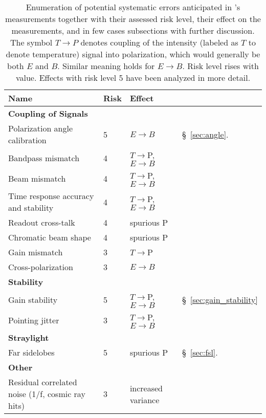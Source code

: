\begin{table}[h!]
\hspace{-0.1in}
\parbox{4.0in}{
\centering
\scriptsize
 \begin{tabular}{p{3.3cm} p{0.5cm} p{1.4cm} p{1.7cm}}
 \hline
\textbf{Name} & \textbf{Risk}&\textbf{Effect} \\
 \hline
\textbf{Coupling of Signals}& &\\
Polarization angle calibration\dotfill&
5&
$E{\to}B$ &
\S~\ref{sec:angle}.
\\
 Bandpass mismatch\dotfill&
 4&
$T{\to}$P, $E{\to}B$
   \\
Beam mismatch\dotfill&
4&
$T{\to}$P, $E{\to}B$
& %
\\
Time response accuracy and stability\dotfill&
4&
$T{\to}$P, $E{\to}B$
\\
Readout cross-talk\dotfill&
4&
spurious P
\\
Chromatic beam shape\dotfill&
4&
spurious P
\\

Gain mismatch\dotfill&
3&
$T{\to}$P
\\


Cross-polarization\dotfill&
3&
$E{\to}B$
\\
\hline
\textbf{Stability} & & \\
Gain stability\dotfill&
5&
$T{\to}$P, $E{\to} B$
&
\S~\ref{sec:gain_stability}
\\
Pointing jitter\dotfill&
3&
$T{\to}$P, $E{\to}B$
\\

\hline
\textbf{Straylight}& & \\
Far sidelobes\dotfill&
5&
spurious P
&
\S~\ref{sec:fsl}.\\
 \hline
\textbf{Other} \\
Residual correlated noise (1/f, cosmic ray hits)\dotfill&
3 &
increased variance
\\
\hline
 \end{tabular}
}
\hspace{-0.0in}
\parbox{2.5in}{
\caption{\captiontext
Enumeration of potential systematic errors anticipated in \pico's measurements together with their assessed risk level,
their effect on the measurements, and in few cases subsections with further discussion. The symbol $T \rightarrow P $ denotes coupling of the intensity (labeled as $T$ to denote temperature) signal into polarization, which would generally be both $E$ and $B$. Similar meaning holds for $E \rightarrow B$. Risk level rises with value. Effects with risk level 5 have been analyzed in more detail.
\label{tbl:SystematicsList2col} }}
\hspace{-0.0in}
\end{table}
